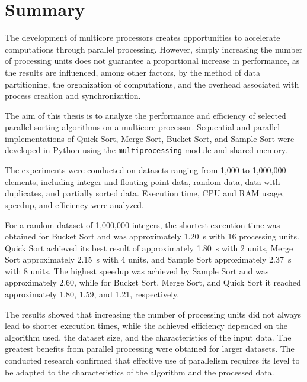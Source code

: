 \cleardoublepage
\chapter*{Summary}

The development of multicore processors creates opportunities to accelerate computations through parallel processing. 
However, simply increasing the number of processing units does not guarantee a proportional increase in performance, 
as the results are influenced, among other factors, by the method of data partitioning, the organization of computations, 
and the overhead associated with process creation and synchronization.

The aim of this thesis is to analyze the performance and efficiency of selected parallel sorting algorithms on a multicore processor. 
Sequential and parallel implementations of Quick Sort, Merge Sort, Bucket Sort, and
Sample Sort were developed in Python using the \texttt{multiprocessing} module and shared memory.

The experiments were conducted on datasets ranging from 1,000 to 1,000,000 elements, 
including integer and floating-point data, random data, data with duplicates, and partially sorted data. 
Execution time, CPU and RAM usage, speedup, and efficiency were analyzed.

For a random dataset of 1,000,000 integers, the shortest execution time was obtained for Bucket Sort 
and was approximately 1.20~s with 16 processing units.
Quick Sort achieved its best result of approximately 1.80~s with 2 units, Merge Sort approximately 2.15~s with 4 units, 
and Sample Sort approximately 2.37~s with 8 units. 
The highest speedup was achieved by Sample Sort and was approximately 2.60, while for Bucket Sort, Merge Sort, 
and Quick Sort it reached approximately 1.80, 1.59, and 1.21, respectively.

The results showed that increasing the number of processing units did not always lead to shorter execution times, 
while the achieved efficiency depended on the algorithm used, the dataset size, and the characteristics of the input data. 
The greatest benefits from parallel processing were obtained for larger datasets. 
The conducted research confirmed that effective use of parallelism requires its level to be adapted to the
characteristics of the algorithm and the processed data.